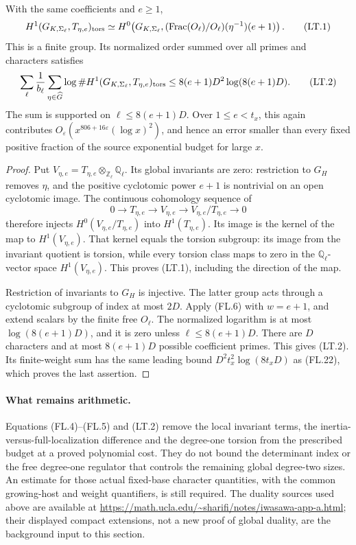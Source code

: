 \begin{proposition}
\label{AC-K26-torsion}
With the same coefficients and \(e\geq1\),
\[
 H^1(G_{K,\Sigma_\ell},T_{\eta,e})_{\rm tors}
       \simeq
 H^0\!\left(G_{K,\Sigma_\ell},
       (\operatorname{Frac}(O_\ell)/O_\ell)
                         (\eta^{-1})(e+1)\right).
 \tag{LT.1}
\]
This is a finite group.
Its normalized order summed over all primes and
characters satisfies
\[
 \sum_\ell\frac1{b_\ell}\sum_{\eta\in\widehat G}
        \log\#H^1(G_{K,\Sigma_\ell},T_{\eta,e})_{\rm tors}
       \leq8(e+1)D^2\log(8(e+1)D).
 \tag{LT.2}
\]
The sum is supported on \(\ell\leq8(e+1)D\).
Over \(1\leq e<t_x\), this again contributes
\(O_\varepsilon(x^{806+16\varepsilon}(\log x)^2)\),
and hence an error smaller than every fixed positive
fraction of the source exponential budget for large \(x\).
\end{proposition}
\begin{proof}
Put \(V_{\eta,e}=T_{\eta,e}\otimes_{\mathbb Z_\ell}\mathbb Q_\ell\).
Its global invariants are zero: restriction to \(G_H\)
removes \(\eta\), and the positive cyclotomic power
\(e+1\) is nontrivial on an open cyclotomic image.
The continuous cohomology sequence of
\[
              0\longrightarrow T_{\eta,e}
               \longrightarrow V_{\eta,e}
               \longrightarrow V_{\eta,e}/T_{\eta,e}
               \longrightarrow0
 \tag{LT.3}
\]
therefore injects \(H^0(V_{\eta,e}/T_{\eta,e})\)
into \(H^1(T_{\eta,e})\).
Its image is the kernel of the map to \(H^1(V_{\eta,e})\).
That kernel equals the torsion subgroup: its image from
the invariant quotient is torsion, while every torsion
class maps to zero in the \(\mathbb Q_\ell\)-vector space
\(H^1(V_{\eta,e})\).
This proves (LT.1), including the direction of the map.

Restriction of invariants to \(G_H\) is injective.
The latter group acts through a cyclotomic subgroup
of index at most \(2D\).
Apply (FL.6) with \(w=e+1\), and extend scalars by the
finite free \(O_\ell\).
The normalized logarithm is at most
\(\log(8(e+1)D)\), and it is zero unless
\(\ell\leq8(e+1)D\).
There are \(D\) characters and at most \(8(e+1)D\)
possible coefficient primes.
This gives (LT.2).
Its finite-weight sum has the same leading bound
\(D^2t_x^2\log(8t_xD)\) as (FL.22), which proves
the last assertion.
\end{proof}

\paragraph{What remains arithmetic.}
Equations (FL.4)--(FL.5) and (LT.2) remove the local
invariant terms, the inertia-versus-full-localization
difference and the degree-one torsion from the prescribed
budget at a proved polynomial cost.
They do not bound the determinant index or the free
degree-one regulator that controls the remaining global
degree-two sizes.
An estimate for those actual fixed-base character
quantities, with the common growing-host and weight
quantifiers, is still required.
The duality sources used above are available at
\url{https://math.ucla.edu/~sharifi/notes/iwasawa-app-a.html};
their displayed compact extensions, not a new proof of
global duality, are the background input to this section.
